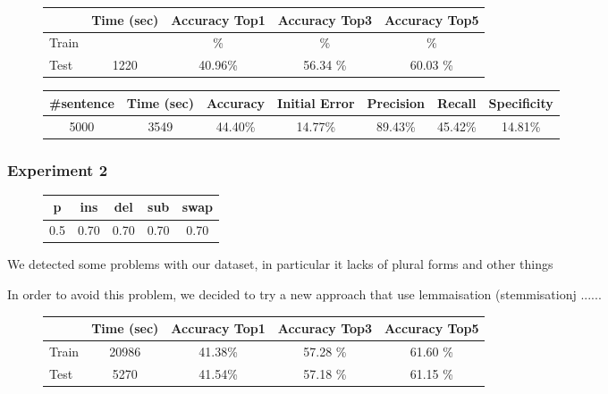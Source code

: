 \begin{figure}[H]
	\centering
	\begin{tabular}{lcccc}
		\toprule
		& Time (sec)  & Accuracy Top1 & Accuracy Top3  &  Accuracy Top5 \\
		\midrule
		Train & \num{} & \%  &  \% &  \%  \\
		Test &	\num{1220}  & \num{40,96}\%  & \num{56,34} \% & \num{60,03} \%  \\
		\bottomrule
	\end{tabular}
	\label{tab:typo-eval1}
\end{figure}


\begin{figure}[H]
	\centering
	\begin{tabular}{ccccccc}
		\toprule
		\#sentence & Time (sec)  & Accuracy & Initial Error  &  Precision & Recall & Specificity \\
		\midrule
		\num{5000}	& \num{3549}  & \num{44,40}\%  & \num{14,77}\% & \num{89,43}\% & \num{45,42}\%  & 
		\num{14,81}\%  
		\\
		\bottomrule
	\end{tabular}
	\label{tab:sentence-eval1}
\end{figure}

\subsubsection{Experiment 2}
\begin{figure}[H]
	\centering
	\begin{tabular}{ccccc}
		\toprule
		p 				 & ins 				 	& del  				&  sub 			   &   swap\\ \midrule
		\num{0.5} & \num{0,70} & \num{0,70}  & \num{0,70} & \num{0,70}\\
		\bottomrule
	\end{tabular}
	\label{tab:error_model2}
\end{figure}

We detected some problems with our dataset, in particular it lacks of plural forms and other things

In order to avoid this problem, we decided to try a new approach that use lemmaisation (stemmisationj ......

\begin{figure}[H]
	\centering
	\begin{tabular}{lcccc}
		\toprule
		& Time (sec)  & Accuracy Top1 & Accuracy Top3  &  Accuracy Top5 \\
		\midrule
		Train & \num{20986} & \num{41,38}\%  & \num{57,28} \% & \num{61,60} \% \\
		Test &	\num{5270}  & \num{41,54}\%  & \num{57,18} \% & \num{61,15} \%  \\
		\bottomrule
	\end{tabular}
	\label{tab:typo-eval2}
\end{figure}


